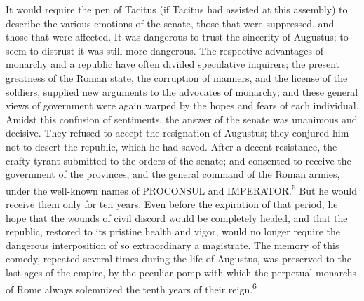 It would require the pen of Tacitus (if Tacitus had assisted at
this assembly) to describe the various emotions of the senate,
those that were suppressed, and those that were affected. It was
dangerous to trust the sincerity of Augustus; to seem to distrust
it was still more dangerous. The respective advantages of
monarchy and a republic have often divided speculative inquirers;
the present greatness of the Roman state, the corruption of
manners, and the license of the soldiers, supplied new arguments
to the advocates of monarchy; and these general views of
government were again warped by the hopes and fears of each
individual. Amidst this confusion of sentiments, the answer of
the senate was unanimous and decisive. They refused to accept the
resignation of Augustus; they conjured him not to desert the
republic, which he had saved. After a decent resistance, the
crafty tyrant submitted to the orders of the senate; and
consented to receive the government of the provinces, and the
general command of the Roman armies, under the well-known names
of PROCONSUL and IMPERATOR.\textsuperscript{5} But he would receive them only for
ten years. Even before the expiration of that period, he hope
that the wounds of civil discord would be completely healed, and
that the republic, restored to its pristine health and vigor,
would no longer require the dangerous interposition of so
extraordinary a magistrate. The memory of this comedy, repeated
several times during the life of Augustus, was preserved to the
last ages of the empire, by the peculiar pomp with which the
perpetual monarchs of Rome always solemnized the tenth years of
their reign.\textsuperscript{6}



